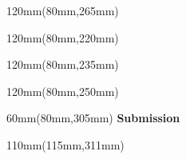 \begin{titlepage}
\ifdefined\advisorExtName
	\begin{textblock*}{120mm}(80mm,265mm)
		\noindent
		\large\textsf{\textcolor{titlecolor}{
			\textbf{\advisorExtName} \\
			\advisorExtTask
		}}
	\end{textblock*}
\fi	
	
\else
	\begin{textblock*}{120mm}(80mm,220mm)
		\noindent
		\large\textsf{\textcolor{titlecolor}{
				\textbf{\reviewerOneName} \\
				\reviewerOneTask
		}}
	\end{textblock*}
	
	\begin{textblock*}{120mm}(80mm,235mm)
		\noindent
		\large\textsf{\textcolor{titlecolor}{
				\textbf{\advisorOneName} \\
				\advisorOneTask
		}}
	\end{textblock*}
\ifdefined\advisorExtName
	\begin{textblock*}{120mm}(80mm,250mm)
		\noindent
		\large\textsf{\textcolor{titlecolor}{
			\textbf{\advisorExtName} \\
			\advisorExtTask
		}}
	\end{textblock*}
\fi
\fi
\begin{textblock*}{60mm}(80mm,305mm)
    \noindent
    \large\textsf{\textcolor{titlecolor}{\textbf{Submission\\}\submissionTime}}
\end{textblock*}

\begin{textblock*}{110mm}(115mm,311mm)
    \noindent
    \hfill\large\textsf{\textcolor{titlecolor}{\textbf{\webadress}}}
\end{textblock*}

\end{titlepage}

\nopagecolor